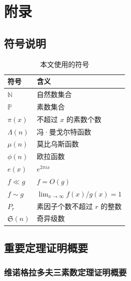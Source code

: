 \section{附录}\label{sec:appendix}

\subsection{符号说明}

\begin{table}[htbp]
    \centering
    \caption{本文使用的符号}
    \label{tab:notation}
    \begin{tabular}{@{}ll@{}}
        \toprule
        \textbf{符号} & \textbf{含义} \\
        \midrule
        $\mathbb{N}$ & 自然数集合 \\
        $\mathbb{P}$ & 素数集合 \\
        $\pi(x)$ & 不超过 $x$ 的素数个数 \\
        $\Lambda(n)$ & 冯·曼戈尔特函数 \\
        $\mu(n)$ & 莫比乌斯函数 \\
        $\phi(n)$ & 欧拉函数 \\
        $e(x)$ & $e^{2\pi i x}$ \\
        $f \ll g$ & $f = O(g)$ \\
        $f \sim g$ & $\lim_{x \to \infty} f(x)/g(x) = 1$ \\
        $P_r$ & 素因子个数不超过 $r$ 的整数 \\
        $\mathfrak{S}(n)$ & 奇异级数 \\
        \bottomrule
    \end{tabular}
\end{table}

\subsection{重要定理证明概要}

\subsubsection{维诺格拉多夫三素数定理证明概要}

